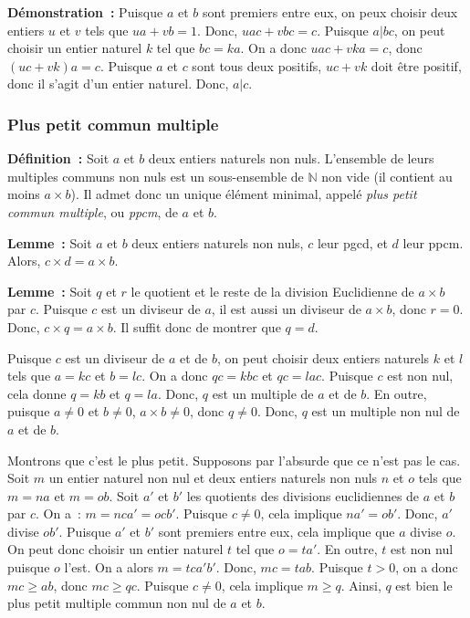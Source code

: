 \noindent\textbf{Démonstration :} Puisque $a$ et $b$ sont premiers entre eux, on peux choisir deux entiers $u$ et $v$ tels que $u a + v b = 1$. 
    Donc, $u a c + v b c = c$.
    Puisque $a \vert b c$, on peut choisir un entier naturel $k$ tel que $b c = k a$.
    On a donc $u a c + v k a = c$, donc $(u c + v k) a = c$.
    Puisque $a$ et $c$ sont tous deux positifs, $u c + v k$ doit être positif, donc il s'agit d'un entier naturel.
    Donc, $a \vert c$.

    \done

\subsubsection{Plus petit commun multiple}

\noindent\textbf{Définition :} Soit $a$ et $b$ deux entiers naturels non nuls. L'ensemble de leurs multiples communs non nuls est un sous-ensemble de $\mathbb{N}$ non vide (il contient au moins $a \times b$). Il admet donc un unique élément minimal, appelé \textit{plus petit commun multiple}, ou \textit{ppcm}, de $a$ et $b$. 

\medskip

\noindent\textbf{Lemme :} Soit $a$ et $b$ deux entiers naturels non nuls, $c$ leur pgcd, et $d$ leur ppcm.
    Alors, $c \times d = a \times b$.

\medskip

\noindent\textbf{Lemme :}
    Soit $q$ et $r$ le quotient et le reste de la division Euclidienne de $a \times b$ par $c$.
    Puisque $c$ est un diviseur de $a$, il est aussi un diviseur de $a \times b$, donc $r = 0$.
    Donc, $c \times q = a \times b$.
    Il suffit donc de montrer que $q = d$. 

    Puisque $c$ est un diviseur de $a$ et de $b$, on peut choisir deux entiers naturels $k$ et $l$ tels que $a = k c$ et $b = l c$.
    On a donc $q c = k b c$ et $q c = l a c$.
    Puisque $c$ est non nul, cela donne $q = k b$ et $q = l a$.
    Donc, $q$ est un multiple de $a$ et de $b$. 
    En outre, puisque $a \neq 0$ et $b \neq 0$, $a \times b \neq 0$, donc $q \neq 0$.
    Donc, $q$ est un multiple non nul de $a$ et de $b$. 

    Montrons que c'est le plus petit. 
    Supposons par l'absurde que ce n'est pas le cas. 
    Soit $m$ un entier naturel non nul et deux entiers naturels non nuls $n$ et $o$ tels que $m = n a$ et $m = o b$.
    Soit $a'$ et $b'$ les quotients des divisions euclidiennes de $a$ et $b$ par $c$.
    On a : $m = n c a' = o c b'$. 
    Puisque $c \neq 0$, cela implique $n a' = o b'$.
    Donc, $a'$ divise $o b'$.
    Puisque $a'$ et $b'$ sont premiers entre eux, cela implique que $a$ divise $o$.
    On peut donc choisir un entier naturel $t$ tel que $o = t a'$. 
    En outre, $t$ est non nul puisque $o$ l'est.
    On a alors $m = t c a' b'$.
    Donc, $m c = t a b$.
    Puisque $t > 0$, on a donc $m c \geq a b$, donc $m c \geq q c$. 
    Puisque $c \neq 0$, cela implique $m \geq q$. 
    Ainsi, $q$ est bien le plus petit multiple commun non nul de $a$ et $b$.

